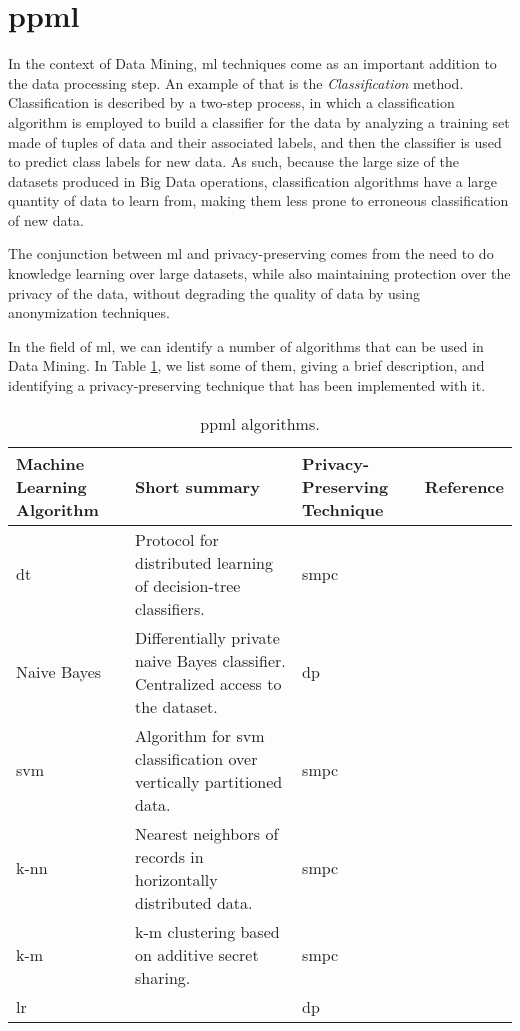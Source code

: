 \section{\acl{ppml}}
\label{sec:PrivacyPreservingMachineLearning}


In the context of Data Mining, \ac{ml} techniques come as an important addition to the data processing step. An example of that is the \textit{Classification} method. Classification is described by a two-step process, in which a classification algorithm is employed to build a classifier for the data by analyzing a training set made of tuples of data and their associated labels, and then the classifier is used to predict class labels for new data. As such, because the large size of the datasets produced in Big Data operations, classification algorithms have a large quantity of data to learn from, making them less prone to erroneous classification of new data.

The conjunction between \ac{ml} and privacy-preserving comes from the need to do knowledge learning over large datasets, while also maintaining protection over the privacy of the data, without degrading the quality of data by using anonymization techniques.

In the field of \ac{ml}, we can identify a number of algorithms that can be used in Data Mining. In Table \ref{table:ppml1}, we list some of them, giving a brief description, and identifying a privacy-preserving technique that has been implemented with it.

\begin{table}[H]
\centering
\caption{\ac{ppml} algorithms.}
\label{table:ppml1}
\begin{tabular}{|p{2.3cm}|p{5cm}|p{3.7cm}|l|}
\hline
\textbf{Machine Learning Algorithm} & \textbf{Short summary} & \textbf{Privacy-Preserving Technique} 
& \textbf{Reference} \\ \hline
\acl{dt} & Protocol for distributed learning of decision-tree classifiers. & \ac{smpc} & \cite{brickell2009privacy} \\ \hline
Naive Bayes & Differentially private naive Bayes classifier. Centralized access to the dataset. & \ac{dp} &\cite{vaidya2013differentially} \\ \hline
\acs{svm}  &Algorithm for \acl{svm} classification over vertically partitioned data. & \ac{smpc} & \cite{yu2006privacy} \\ \hline
\acs{k-nn}  & Nearest neighbors of records in horizontally distributed data. & \ac{smpc}  & \cite{shaneck2006privacy} \\ \hline
\acl{k-m} & \acl{k-m} clustering based on additive secret sharing. & \ac{smpc}  & \cite{doganay2008distributed} \\\hline
\ac{lr} &     &  \ac{dp} & \cite{chaudhuri2009privacy} \\\hline
\end{tabular}
\end{table}


